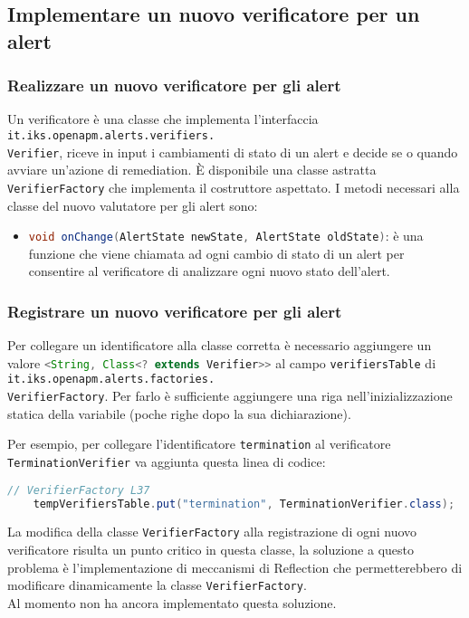 \subsection{Implementare un nuovo verificatore per un alert}
\label{newverificatore}
	\subsubsection{Realizzare un nuovo verificatore per gli alert}
	
		Un verificatore è una classe che implementa l'interfaccia \lstinline{it.iks.openapm.alerts.verifiers.} \\
		\lstinline{Verifier},
		riceve in input i cambiamenti di stato di un alert e decide se o quando avviare un'azione di remediation.
		È disponibile una classe astratta \lstinline{VerifierFactory} che implementa il costruttore aspettato.
		I metodi necessari alla classe del nuovo valutatore per gli alert sono:
			
		\begin{itemize}
		
			\item \lstinline[language=Java]{void onChange(AlertState newState, AlertState oldState)}:
				è una funzione che viene chiamata ad ogni cambio di stato di un alert per consentire
				al verificatore di analizzare ogni nuovo stato dell'alert.
		\end{itemize}
	
	\subsubsection{Registrare un nuovo verificatore per gli alert}
	
		Per collegare un identificatore alla classe corretta è necessario aggiungere un valore 
		\lstinline[language=Java]{<String, Class<? extends Verifier>>} al campo \lstinline{verifiersTable} 
		di \lstinline{it.iks.openapm.alerts.factories.}\\ \lstinline{VerifierFactory}. 
		Per farlo è sufficiente aggiungere una riga nell'inizializzazione statica della variabile 
		(poche righe dopo la sua dichiarazione).

		Per esempio, per collegare l'identificatore \lstinline{termination} al verificatore \lstinline{TerminationVerifier} 
		va aggiunta questa linea di codice:
		\begin{lstlisting}[language=Java]
	// VerifierFactory L37
	tempVerifiersTable.put("termination", TerminationVerifier.class);
		\end{lstlisting}
		
		La modifica della classe \verb=VerifierFactory= alla registrazione di ogni nuovo verificatore risulta un punto critico in 
		questa classe, la soluzione a questo problema è l'implementazione di meccanismi di Reflection che permetterebbero
		di modificare dinamicamente la classe \verb=VerifierFactory=.\\
		Al momento \GroupName{} non ha ancora implementato questa soluzione.
